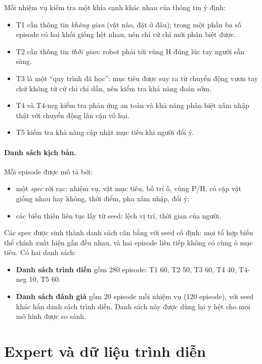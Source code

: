 Mỗi nhiệm vụ kiểm tra một khía cạnh khác nhau của thông tin ý định:
\begin{itemize}
  \item T1 cần thông tin \emph{không gian} (vật nào, đặt ở đâu); trong một phần ba số episode có hai khối giống hệt nhau, nên chỉ cử chỉ mới phân biệt được.
  \item T2 cần thông tin \emph{thời gian}: robot phải tới vùng H đúng lúc tay người sẵn sàng.
  \item T3 là một ``quy trình đã học'': mục tiêu được suy ra từ chuyển động vươn tay chứ không từ cử chỉ chỉ dẫn, nên kiểm tra khả năng đoán sớm.
  \item T4 và T4-neg kiểm tra phản ứng an toàn và khả năng phân biệt xâm nhập thật với chuyển động lân cận vô hại.
  \item T5 kiểm tra khả năng cập nhật mục tiêu khi người đổi ý.
\end{itemize}

\paragraph{Danh sách kịch bản.} Mỗi episode được mô tả bởi:
\begin{itemize}
  \item một \emph{spec} rời rạc: nhiệm vụ, vật mục tiêu, bố trí ô, vùng P/H, có cặp vật giống nhau hay không, thời điểm, pha xâm nhập, đổi ý;
  \item các biến thiên liên tục lấy từ seed: lệch vị trí, thời gian của người.
\end{itemize}
Các spec được sinh thành danh sách cân bằng với seed cố định: mọi tổ hợp biến thể chính xuất hiện gần đều nhau, và hai episode liên tiếp không có cùng ô mục tiêu. Có hai danh sách:
\begin{itemize}
  \item \textbf{Danh sách trình diễn} gồm 280 episode: T1 60, T2 50, T3 60, T4 40, T4-neg 10, T5 60.
  \item \textbf{Danh sách đánh giá} gồm 20 episode mỗi nhiệm vụ (120 episode), với seed khác hẳn danh sách trình diễn. Danh sách này được dùng lại y hệt cho mọi mô hình được so sánh.
\end{itemize}

\section{Expert và dữ liệu trình diễn}
\label{sec:expert}

